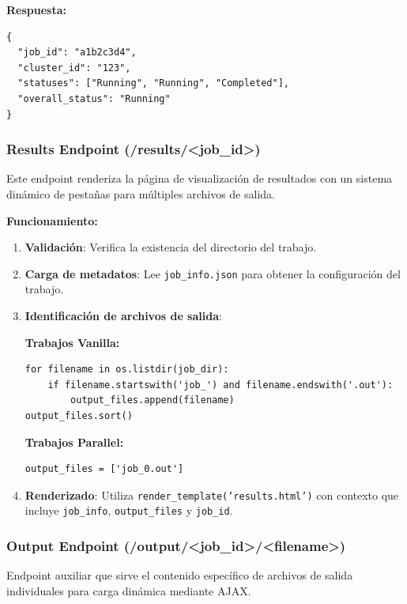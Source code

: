 \textbf{Respuesta:}

\begin{verbatim}
{
  "job_id": "a1b2c3d4",
  "cluster_id": "123", 
  "statuses": ["Running", "Running", "Completed"],
  "overall_status": "Running"
}
\end{verbatim}

\subsubsection{Results Endpoint (/results/<job\_id>)}
\noindent

Este endpoint renderiza la página de visualización de resultados con un sistema dinámico de pestañas para múltiples archivos de salida.

\textbf{Funcionamiento:}

\begin{enumerate}
	\item \textbf{Validación}: Verifica la existencia del directorio del trabajo.

	\item \textbf{Carga de metadatos}: Lee \texttt{job\_info.json} para obtener la configuración del trabajo.

	\item \textbf{Identificación de archivos de salida}:

	      \textbf{Trabajos Vanilla:}
	      \begin{verbatim}
for filename in os.listdir(job_dir):
    if filename.startswith('job_') and filename.endswith('.out'):
        output_files.append(filename)
output_files.sort()
	      \end{verbatim}

	      \textbf{Trabajos Parallel:}
	      \begin{verbatim}
output_files = ['job_0.out']
	      \end{verbatim}

	\item \textbf{Renderizado}: Utiliza \texttt{render\_template('results.html')} con contexto que incluye \texttt{job\_info}, \texttt{output\_files} y \texttt{job\_id}.
\end{enumerate}

\subsubsection{Output Endpoint (/output/<job\_id>/<filename>)}
\noindent

Endpoint auxiliar que sirve el contenido específico de archivos de salida individuales para carga dinámica mediante AJAX.

